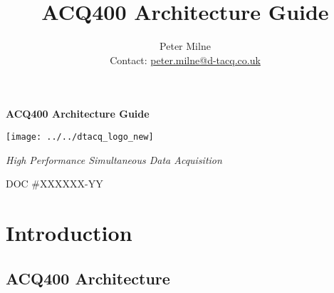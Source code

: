 \documentclass[]{article}
\newcommand{\mytitle}{ACQ400 Architecture Guide}
\begin{document}
\title{ACQ400 Architecture Guide}
\author{Peter Milne \\ Contact: \href{mailto:peter.milne@d-tacq.co.uk}{peter.milne@d-tacq.co.uk} }

\thispagestyle{empty} %
\begin{center}\huge{\textbf{\mytitle}}\end{center}
\vspace{2.5cm}
\begin{center}
	\texttt{[image: ../../dtacq\_logo\_new]}
\end{center}
\begin{center}\textcolor{dtacqblue}{\large{\textit{High Performance Simultaneous Data Acquisition}}}\end{center}
\vspace{5cm}
\begin{center}\large{DOC \#XXXXXX-YY}\end{center}


\begin{versionhistory}
\end{versionhistory}
\setcounter{table}{0} %

\pagebreak

\tableofcontents


\section{Introduction}

\subsection{ACQ400 Architecture}\label{sec:daq-appliances}
\end{document}
